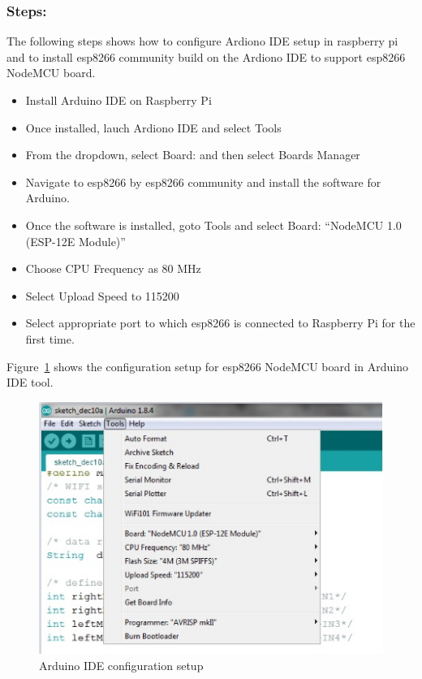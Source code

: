 \subsubsection{Steps:}
The following steps shows how to configure Ardiono IDE setup in raspberry pi 
and to install esp8266 community build on the Ardiono IDE to support esp8266 
NodeMCU board.

\begin{itemize}

\item Install Arduino IDE on Raspberry Pi
\item Once installed, lauch Ardiono IDE and select Tools
\item From the dropdown, select Board:  and then select Boards Manager
\item Navigate to esp8266 by esp8266 community and install the
  software for Arduino.
\item Once the software is installed, goto Tools and select Board:
  ``NodeMCU 1.0 (ESP-12E Module)''
\item Choose CPU Frequency as 80 MHz
\item Select Upload Speed to 115200
\item Select appropriate port to which esp8266 is connected to
  Raspberry Pi for the first time.

\end{itemize}
Figure~\ref{F:arduino} shows the configuration setup for esp8266 NodeMCU 
board in Arduino IDE tool.
\begin{figure}
	\includegraphics[width=1.0\columnwidth]{images/Arduino-settings.jpg}
	\caption{Arduino IDE configuration setup}\label{F:arduino}
\end{figure}

